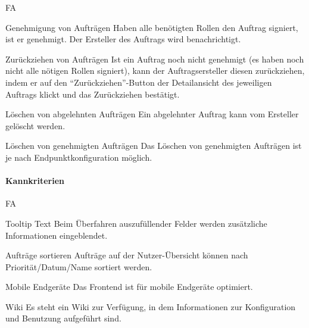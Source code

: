\begin{Kriterien}{FA}
	\newpage

	\item[Genehmigung von Aufträgen] Haben alle benötigten Rollen den Auftrag signiert, ist er genehmigt. Der Ersteller des Auftrags wird benachrichtigt.

	\item[Zurückziehen von Aufträgen] Ist ein Auftrag noch nicht genehmigt (es haben noch nicht alle nötigen Rollen signiert), kann der Auftragsersteller diesen zurückziehen, indem er auf den \enquote{Zurückziehen}-Button der Detailansicht des jeweiligen Auftrags klickt und das Zurückziehen bestätigt.

	\item[Löschen von abgelehnten Aufträgen] Ein abgelehnter Auftrag kann vom Ersteller gelöscht werden.

	\item[Löschen von genehmigten Aufträgen] Das Löschen von genehmigten Aufträgen ist je nach Endpunktkonfiguration möglich.

\end{Kriterien}

\paragraph{Kannkriterien}

\begin{Kriterien}{FA}

	\item[Tooltip Text] Beim Überfahren auszufüllender Felder werden zusätzliche Informationen eingeblendet.

	\item[Aufträge sortieren] Aufträge auf der Nutzer-Übersicht können nach Priorität/Datum/Name sortiert werden.

	\item[Mobile Endgeräte] Das Frontend ist für mobile Endgeräte optimiert.

	\item[\gls{Wiki}] Es steht ein Wiki zur Verfügung, in dem Informationen zur Konfiguration und Benutzung aufgeführt sind.



\end{Kriterien}
